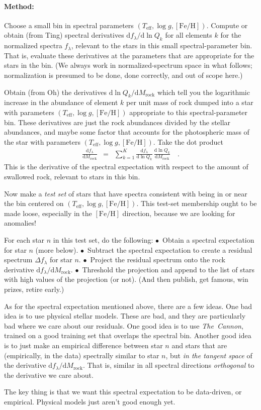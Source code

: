 \documentclass[12pt]{article}
\newcommand{\project}[1]{\textsl{#1}}
\newcommand{\TheCannon}{\project{The~Cannon}}
\newcommand{\dd}{\mathrm{d}}
\newcommand{\teff}{T_{\mathrm{eff}}}
\newcommand{\logg}{\log g}
\newcommand{\feh}{[\mathrm{Fe}/\mathrm{H}]}
\newcommand{\rock}{\mathrm{rock}}
\begin{document}
\paragraph{Method:}
Choose a small bin in spectral parameters $(\teff, \logg, \feh)$.
Compute or obtain (from Ting) spectral derivatives $\dd f_\lambda/\dd\ln Q_k$ for
all elements $k$ for the normalized spectra $f_\lambda$, relevant
to the stars in this small spectral-parameter bin.
That is, evaluate these derivatives at the parameters that are
appropriate for the stars in the bin.
(We always work in normalized-spectrum space in what follows; normalization
is presumed to be done, done correctly, and out of scope here.)

Obtain (from Oh) the derivatives $\dd\ln Q_k/\dd M_\rock$ which tell
you the logarithmic increase in the abundance of element $k$ per unit
mass of rock dumped into a star with parameters $(\teff, \logg, \feh)$
appropriate to this spectral-parameter bin.
These derivatives are just the rock abundances divided by the stellar
abundances, and maybe some factor that accounts for the photospheric
mass of the star with parameters $(\teff, \logg, \feh)$.
Take the dot product
\begin{eqnarray}
  \frac{\dd f_\lambda}{\dd M_\rock} &=&
  \sum_{k=1}^K \frac{\dd f_\lambda}{\dd\ln Q_k}\,\frac{\dd\ln Q_k}{\dd M_\rock}
  \quad .
\end{eqnarray}
This is the derivative of the spectral expectation with respect to
the amount of swallowed rock, relevant to stars in this bin.

Now make a \emph{test set} of
stars that have spectra consistent with being in or near
the bin centered on $(\teff, \logg, \feh)$.
This test-set membership ought to be made loose, especially in the $\feh$
direction, because we are looking for anomalies!

For each star $n$ in this test set, do the following:
$\bullet$~Obtain a spectral expectation for star $n$ (more below).
$\bullet$~Subtract the spectral expectation to create a residual spectrum
          $\Delta f_\lambda$ for star $n$.
$\bullet$~Project the residual spectrum onto the rock derivative
          $\dd f_\lambda / \dd M_\rock$.
$\bullet$~Threshold the projection and append to the list of stars with
          high values of the projection (or not).
(And then publish, get famous, win prizes, retire early.)

As for the spectral expectation mentioned above, there are a few ideas.
One bad idea is to use physical stellar models. These are bad, and they
are particularly bad where we care about our residuals. One good idea
is to use \TheCannon, trained on a good training set that overlaps the
spectral bin.
Another good idea is to just make an empirical difference between star
$n$ and stars that are (empirically, in the data) spectrally similar to
star $n$, but \emph{in the tangent space} of the derivative 
${\dd f_\lambda}/{\dd M_\rock}$.
That is, similar in all spectral directions \emph{orthogonal}
to the derivative we care about.

The key thing is that we want this spectral expectation to be data-driven,
or empirical.
Physical models just aren't good enough yet.
\end{document}
